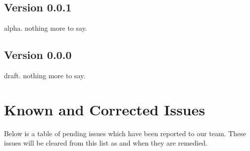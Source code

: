 \documentclass[a4paper,10pt,english,openany]{sphinxmanual}
\begin{document}
\subsection{Version 0.0.1}
\label{\detokenize{releasenotes:version-0-0-1}}
\sphinxAtStartPar
alpha. nothing more to say.


\subsection{Version 0.0.0}
\label{\detokenize{releasenotes:version-0-0-0}}
\sphinxAtStartPar
draft. nothing more to say.


\section{Known and Corrected Issues}
\label{\detokenize{releasenotes:known-and-corrected-issues}}
\sphinxAtStartPar
Below is a table of pending issues which have been reported to our team. These issues will be cleared from this list as and when they are remedied.
\end{document}
